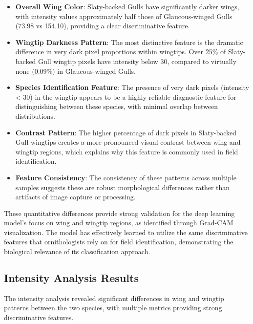\documentclass[a4paper,12pt]{report}
\begin{document}
\begin{itemize}
    \item \textbf{Overall Wing Color}: Slaty-backed Gulls have significantly darker wings, with intensity values approximately half those of Glaucous-winged Gulls (73.98 vs 154.10), providing a clear discriminative feature.
    
    \item \textbf{Wingtip Darkness Pattern}: The most distinctive feature is the dramatic difference in very dark pixel proportions within wingtips. Over 25\% of Slaty-backed Gull wingtip pixels have intensity below 30, compared to virtually none (0.09\%) in Glaucous-winged Gulls.
    
    \item \textbf{Species Identification Feature}: The presence of very dark pixels (intensity < 30) in the wingtip appears to be a highly reliable diagnostic feature for distinguishing between these species, with minimal overlap between distributions.
    
    \item \textbf{Contrast Pattern}: The higher percentage of dark pixels in Slaty-backed Gull wingtips creates a more pronounced visual contrast between wing and wingtip regions, which explains why this feature is commonly used in field identification.
    
    \item \textbf{Feature Consistency}: The consistency of these patterns across multiple samples suggests these are robust morphological differences rather than artifacts of image capture or processing.
\end{itemize}

These quantitative differences provide strong validation for the deep learning model's focus on wing and wingtip regions, as identified through Grad-CAM visualization. The model has effectively learned to utilize the same discriminative features that ornithologists rely on for field identification, demonstrating the biological relevance of its classification approach.

\subsection{Intensity Analysis Results}

The intensity analysis revealed significant differences in wing and wingtip patterns between the two species, with multiple metrics providing strong discriminative features.
\end{document}
